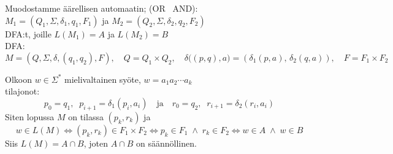 \documentclass[12pt,a4paper]{article}
\begin{document}
\bigskip
Muodostamme äärellisen automaatin; (OR \rightarrow \, AND):\\
$M_1=(Q_1,\Sigma,\delta_1,q_1,F_1)$ ja
$M_2=(Q_2,\Sigma,\delta_2,q_2,F_2)$\\

DFA:t, joille $L(M_1)=A$ ja $L(M_2)=B$\\

DFA:
\[
M=(Q,\Sigma,\delta,(q_1,q_2),F),\quad
Q=Q_1\times Q_2,\quad
\delta\big((p,q),a\big)=(\delta_1(p,a),\,\delta_2(q,a)),\quad
F=F_1\times F_2
\]

Olkoon $w\in\Sigma^*$ mielivaltainen syöte, $w=a_1a_2\cdots a_k$\\

tilajonot:
\[
p_0=q_1,\;\; p_{i+1}=\delta_1(p_i,a_i)
\quad\text{ja}\quad
r_0=q_2,\;\; r_{i+1}=\delta_2(r_i,a_i)
\]
Siten lopussa $M$ on tilassa $(p_k,r_k)$ ja
\[
w\in L(M) \iff (p_k,r_k)\in F_1\times F_2
\iff p_k\in F_1 \;\land\; r_k\in F_2
\iff w\in A \;\land\; w\in B
\]
Siis $L(M)=A\cap B$, joten $A\cap B$ on säännöllinen.\\
\end{document}
